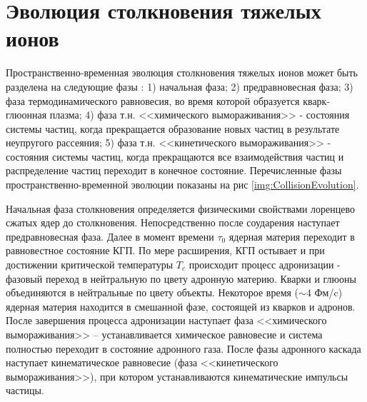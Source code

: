 \begin{comment}
	Переход из КГП в состояние адронного газа называют адронизацией кварк глюонной плазмы. Основными моделями адронизации КГП являются модель рекомбинации и модель фрагментации струн.
	
	\begin{figure}[] 
		\center
		\includegraphics [width = 0.7\linewidth] {Intro/PhaseDiagram.png}
		\caption{Теоретическая фазовая диаграмма ядерной материи для двух безмассовых кварков в зависимости от температуры T и барионного химического потенциала}
		\label{img:PhaseDiagram}  
	\end{figure}
	
	
	Температура перехода соответствует плотности энергии $\epsilon = 1$ ГэВ/фм$^3$, что почти на порядок превышает плотность ядерного вещества $\epsilon_0 = 0.15$ ГэВ/фм$^3$[1407.5003]. Температуры и давления, необходимые для образования кварк-глюонной материи, достигаются в столкновениях тяжелых релятивистских ионоов.
	
	Исследованию КГП в релятивистских столкновениях посвящены такие эксперименты, как PHENIX и STAR (BNL), ALICE(CERN), CBM(JSI), MPD(NICA) и другие.
\end{comment}

\section{Эволюция столкновения тяжелых ионов}

Пространственно-временная эволюция столкновения тяжелых ионов может быть разделена на следующие фазы \cite{QGP_signatures}: 1) начальная фаза; 2) предравновесная фаза; 3) фаза термодинамического равновесия, во время которой образуется кварк-глюонная плазма; 4) фаза т.н. <<химического вымораживания>> - состояния системы частиц, когда прекращается образование новых частиц в результате неупругого рассеяния; 5) фаза т.н. <<кинетического вымораживания>> - состояния системы частиц, когда прекращаются все взаимодействия частиц и распределение частиц переходит в конечное состояние.  
Перечисленные фазы пространственно-временной эволюции показаны на рис  \ref{img:CollisionEvolution}.

Начальная фаза столкновения определяется физическими свойствами лоренцево сжатых ядер до столкновения. Непосредственно после соударения наступает предравновесная фаза. Далее в момент времени $\tau_0$ ядерная материя переходит в равновестное состояние КГП. По мере расширения, КГП остывает и при достижении критической температуры $T_c$ происходит процесс адронизации - фазовый переход в нейтральную по цвету адронную материю. Кварки и глюоны объединяются в нейтральные по цвету объекты. Некоторое время ($\sim 4$ Фм/c) ядерная материя находится в смешанной фазе, состоящей из кварков и адронов. После завершения процесса адронизации наступает фаза <<химического вымораживания>> -- устанавливается химическое равновесие и система полностью переходит в состояние адронного газа. После фазы адронного каскада наступает кинематическое равновесие (фаза <<кинетического вымораживания>>), при котором устанавливаются кинематические импульсы частицы.

